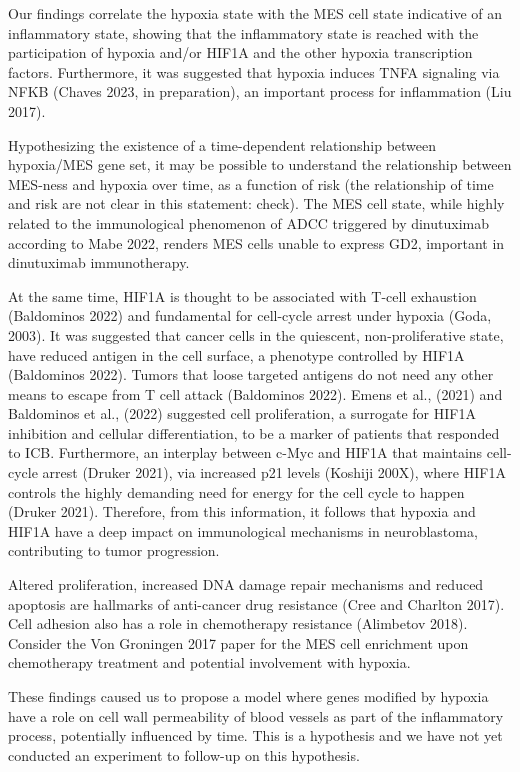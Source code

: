 \documentclass[
]{article}
\begin{document}
Our findings correlate the hypoxia state with the MES cell state
indicative of an inflammatory state, showing that the inflammatory state
is reached with the participation of hypoxia and/or HIF1A and the other
hypoxia transcription factors. Furthermore, it was suggested that
hypoxia induces TNFA signaling via NFKB (Chaves 2023, in preparation),
an important process for inflammation (Liu 2017).

Hypothesizing the existence of a time-dependent relationship between
hypoxia/MES gene set, it may be possible to understand the relationship
between MES-ness and hypoxia over time, as a function of risk (the
relationship of time and risk are not clear in this statement: check).
The MES cell state, while highly related to the immunological phenomenon
of ADCC triggered by dinutuximab according to Mabe 2022, renders MES
cells unable to express GD2, important in dinutuximab immunotherapy.

At the same time, HIF1A is thought to be associated with T-cell
exhaustion (Baldominos 2022) and fundamental for cell-cycle arrest under
hypoxia (Goda, 2003). It was suggested that cancer cells in the
quiescent, non-proliferative state, have reduced antigen in the cell
surface, a phenotype controlled by HIF1A (Baldominos 2022). Tumors that
loose targeted antigens do not need any other means to escape from T
cell attack (Baldominos 2022). Emens et al., (2021) and Baldominos et
al., (2022) suggested cell proliferation, a surrogate for HIF1A
inhibition and cellular differentiation, to be a marker of patients that
responded to ICB. Furthermore, an interplay between c-Myc and HIF1A that
maintains cell-cycle arrest (Druker 2021), via increased p21 levels
(Koshiji 200X), where HIF1A controls the highly demanding need for
energy for the cell cycle to happen (Druker 2021). Therefore, from this
information, it follows that hypoxia and HIF1A have a deep impact on
immunological mechanisms in neuroblastoma, contributing to tumor
progression.

Altered proliferation, increased DNA damage repair mechanisms and
reduced apoptosis are hallmarks of anti-cancer drug resistance (Cree and
Charlton 2017). Cell adhesion also has a role in chemotherapy resistance
(Alimbetov 2018). Consider the Von Groningen 2017 paper for the MES cell
enrichment upon chemotherapy treatment and potential involvement with
hypoxia.

These findings caused us to propose a model where genes modified by
hypoxia have a role on cell wall permeability of blood vessels as part
of the inflammatory process, potentially influenced by time. This is a
hypothesis and we have not yet conducted an experiment to follow-up on
this hypothesis.
\end{document}
